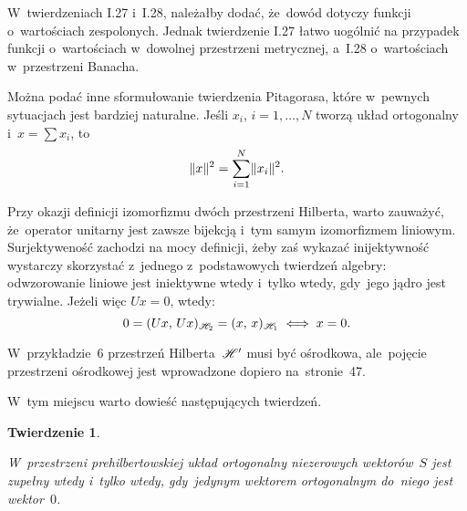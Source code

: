 \documentclass[a4paper,11pt]{article}
\numberwithin{equation}{section}
\newtheorem{theorem}{Twierdzenie}
\begin{document}
\VerSpaceFour





\noindent
{} W~twierdzeniach I.27 i~I.28, należałby dodać, że~dowód
dotyczy funkcji o~wartościach zespolonych. Jednak twierdzenie I.27
łatwo uogólnić na przypadek funkcji o~wartościach w~dowolnej
przestrzeni metrycznej, a~I.28 o~wartościach w~przestrzeni
Banacha. %

\VerSpaceFour




\noindent
{} Można podać inne sformułowanie twierdzenia Pitagorasa,
które w~pewnych sytuacjach jest bardziej naturalne. Jeśli $x_{ i }$,
$i = 1, \ldots, N$ tworzą układ ortogonalny i~$x = \sum x_{ i }$, to
\begin{equation}
  \label{eq:RS-Vol-I-s01-16}
  \lVert{  x  }\rVert^{ 2 } = \sum_{ i = 1 }^{ N } \lVert{  x_{ i }  }\rVert^{ 2 }.
\end{equation}

\VerSpaceFour





\noindent
{} Przy okazji definicji izomorfizmu dwóch przestrzeni
Hilberta, warto zauważyć, że~operator unitarny jest zawsze bijekcją
i~tym samym izomorfizmem liniowym. Surjektyweność zachodzi na mocy
definicji, żeby zaś wykazać inijektywność wystarczy skorzystać
z~jednego z~podstawowych twierdzeń algebry: odwzorowanie liniowe jest
iniektywne wtedy i~tylko wtedy, gdy~jego jądro jest trywialne. Jeżeli więc
$U x = 0$, wtedy:
\begin{equation*}
  \label{eq:RS-Vol-I-s01-17}
  0 = ( U x, \, U x )_{ \mathcal{H}_{ 2 } } = ( x, \, x )_{ \mathcal{H}_{ 1 } }
  \iff x = 0.
\end{equation*}

\VerSpaceFour





\noindent
{} W~przykładzie~6 przestrzeń Hilberta~$\mathcal{H}'$ musi być
ośrodkowa, ale~pojęcie przestrzeni ośrodkowej jest wprowadzone dopiero
na~stronie~47. %

\VerSpaceFour





\noindent
{} W~tym miejscu warto dowieść następujących twierdzeń.





\begin{theorem}
  \label{thm:UkladZupelny}

  W~przestrzeni prehilbertowskiej układ ortogonalny niezerowych
  wektorów~$S$ jest zupełny wtedy i~tylko wtedy, gdy~jedynym wektorem
  ortogonalnym do~niego jest wektor~$0$.

\end{theorem}
\end{document}
